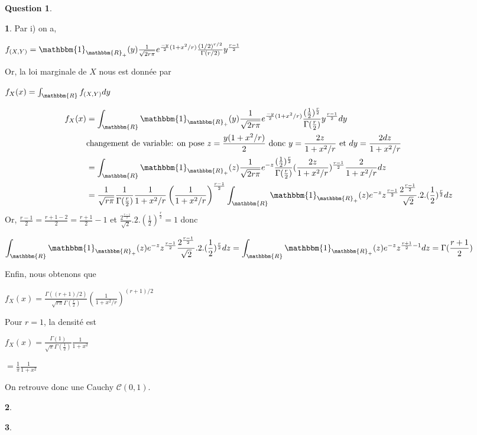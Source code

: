 \documentclass[12pt]{article}
\newcommand{\R}{\mathbbm{R}}
\newcommand{\1}{\mathbbm{1}}
\newcommand{\Cc}{\mathcal{C}}
\theoremstyle{definition}\newtheorem{defn}{Définition}
\theoremstyle{definition}\newtheorem{exm}{Exemple}
\theoremstyle{definition}\newtheorem{rem}{Remarque}
\theoremstyle{definition}\newtheorem{algo}{Algorithme}
\theoremstyle{remark}\newtheorem{exo}{Exercice}
\theoremstyle{remark}\newtheorem{nota}{Notation}
\theoremstyle{definition}\newtheorem{1q}{Question}
\theoremstyle{definition}\newtheorem{2q}{Question}
\theoremstyle{definition}\newtheorem{3q}{Question}
\theoremstyle{definition}\newtheorem{4q}{Question}
\theoremstyle{definition}\newtheorem{2qs1}{}
\theoremstyle{definition}\newtheorem{2qs2}{}
\theoremstyle{definition}\newtheorem{2qs3}{}
\theoremstyle{definition}\newtheorem{2qs4}{}
\theoremstyle{definition}\newtheorem{4qs2}{}
\theoremstyle{definition}\newtheorem{4qs3}{}
\begin{document}
\begin{2q}
\begin{2qs4}
Par i) on a, 
\begin{center} $f_{(X,Y)} = \1_{\R_+}(y)\frac{1}{\sqrt{2r\pi}}e^{\frac{-y}{2}(1+x^2/r)}\frac{(1/2)^{r/2}}{\Gamma(r/2)}y^{ \frac{r-1}{2}}$\end{center}
Or, la loi marginale de $X$ nous est donnée par
\begin{center}$ f_X(x) = \int_\R f_{(X,Y)}dy$\end{center}
\begin{align*}
f_X(x) &=  \int_\R \1_{\R_+}(y)\frac{1}{\sqrt{2r\pi}}e^{\frac{-y}{2}(1+x^2/r)}\frac{(\frac{1}{2})^{\frac{r}{2}}}{\Gamma(\frac{r}{2})}y^{ \frac{r-1}{2}} dy\\
&\text{changement de variable: on pose $z=\frac{y(1+x^2/r)}{2}$ donc $y=\frac{2z}{1+x^2/r}$ et $dy = \frac{2dz}{1+x^2/r}$}\\
&= \int_\R \1_{\R_+}(z)\frac{1}{\sqrt{2r\pi}}e^{-z}\frac{(\frac{1}{2})^{\frac{r}{2}}}{\Gamma(\frac{r}{2})}(\frac{2z}{1+x^2/r})^{ \frac{r-1}{2}} \frac{2}{1+x^2/r}dz\\
&= \frac{1}{\sqrt{r\pi}}\frac{1}{\Gamma(\frac{r}{2})}\frac{1}{1+x^2/r}\left(\frac{1}{1+x^2/r}\right)^{ \frac{r-1}{2}}\int_\R \1_{\R_+}(z)e^{-z}z^{ \frac{r-1}{2}} \frac{2^{ \frac{r-1}{2}}}{\sqrt{2}}.2.(\frac{1}{2})^{\frac{r}{2}}dz\\
\end{align*}
Or, $\displaystyle\frac{r-1}{2}=\frac{r+1-2}{2}=\frac{r+1}{2}-1$ et $\displaystyle\frac{2^{ \frac{r-1}{2}}}{\sqrt{2}}.2.(\frac{1}{2})^{\frac{r}{2}}=1$ donc
\begin{center}$\displaystyle\int_\R \1_{\R_+}(z)e^{-z}z^{ \frac{r-1}{2}} \frac{2^{ \frac{r-1}{2}}}{\sqrt{2}}.2.(\frac{1}{2})^{\frac{r}{2}}dz =\displaystyle\int_\R \1_{\R_+}(z)e^{-z}z^{ \frac{r+1}{2}-1} dz = \Gamma(\frac{r+1}{2}) $\end{center}
Enfin, nous obtenons que 
\begin{center} $f_X(x) = \displaystyle\frac{\Gamma((r+1)/2)}{\sqrt{r\pi}\Gamma(\frac{r}{2})}\left(\frac{1}{1+x^2/r}\right)^{(r+1)/2}$\end{center}
Pour $r=1$, la densité est
\begin{center}$f_X(x) =  \displaystyle\frac{\Gamma(1)}{\sqrt{\pi}\Gamma(\frac{1}{2})}\frac{1}{1+x^2}$ \end{center}
\begin{center}$=\displaystyle\frac{1}{\pi}\frac{1}{1+x^2}$ \end{center}
On retrouve donc une Cauchy $\Cc(0,1)$.
\end{2qs4}

\begin{2qs4}
\end{2qs4}

\begin{2qs4}
\end{2qs4}


\end{2q}
\end{document}
